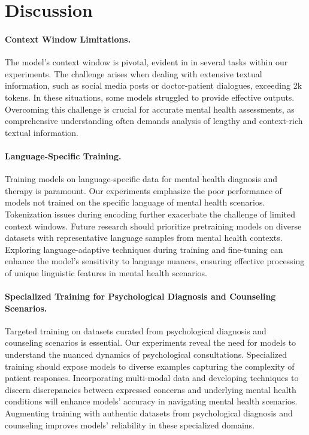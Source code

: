 
\section{Discussion}

\paragraph{Context Window Limitations.} The model's context window is pivotal, evident in in several tasks within our experiments. The challenge arises when dealing with extensive textual information, such as social media posts or doctor-patient dialogues, exceeding 2k tokens. In these situations, some models struggled to provide effective outputs. Overcoming this challenge is crucial for accurate mental health assessments, as comprehensive understanding often demands analysis of lengthy and context-rich textual information.

\paragraph{Language-Specific Training.} Training models on language-specific data for mental health diagnosis and therapy is paramount. Our experiments emphasize the poor performance of models not trained on the specific language of mental health scenarios. Tokenization issues during encoding further exacerbate the challenge of limited context windows. Future research should prioritize pretraining models on diverse datasets with representative language samples from mental health contexts. Exploring language-adaptive techniques during training and fine-tuning can enhance the model's sensitivity to language nuances, ensuring effective processing of unique linguistic features in mental health scenarios.

\paragraph{Specialized Training for Psychological Diagnosis and Counseling Scenarios.} Targeted training on datasets curated from psychological diagnosis and counseling scenarios is essential. Our experiments reveal the need for models to understand the nuanced dynamics of psychological consultations. Specialized training should expose models to diverse examples capturing the complexity of patient responses. Incorporating multi-modal data and developing techniques to discern discrepancies between expressed concerns and underlying mental health conditions will enhance models' accuracy in navigating mental health scenarios. Augmenting training with authentic datasets from psychological diagnosis and counseling improves models' reliability in these specialized domains.